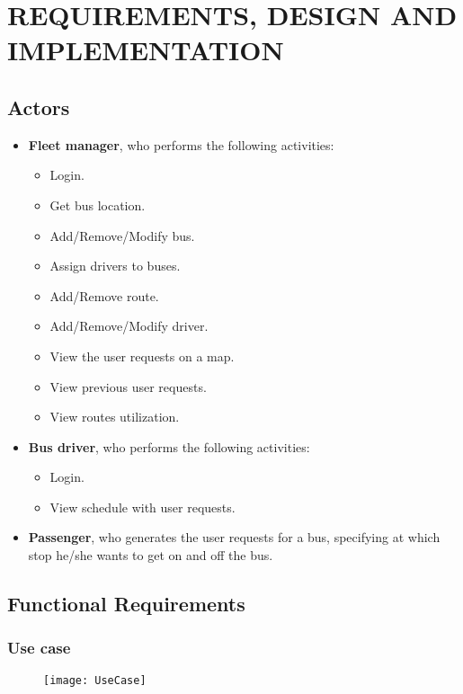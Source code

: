 \section{REQUIREMENTS, DESIGN AND IMPLEMENTATION}
\subsection{Actors}
\begin{itemize}
	\item \textbf{Fleet manager}, who performs the following activities:
	\begin{itemize}
		\item Login.
		\item Get bus location.
		\item Add/Remove/Modify bus.
		\item Assign drivers to buses.
		\item Add/Remove route.
		\item Add/Remove/Modify driver.
		\item View the user requests on a map.
		\item View previous user requests.
		\item View routes utilization.
	\end{itemize}
	\item \textbf{Bus driver}, who performs the following activities:
	\begin{itemize}
		\item Login.
		\item View schedule with user requests.
	\end{itemize}
	\item \textbf{Passenger}, who generates the user requests for a bus, specifying at which stop he/she wants to get on and off the bus.
\end{itemize}

\subsection{Functional Requirements}
\subsubsection{Use case}
\begin{figure}[H]
	\centering
	\texttt{[image: UseCase]}
\end{figure}

